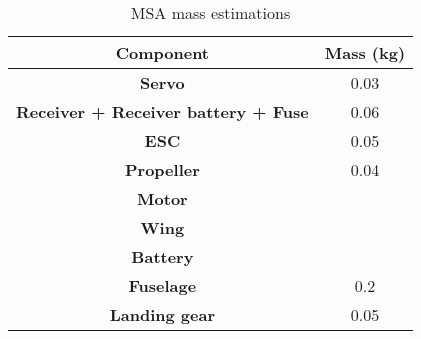 \begin{table}[H]
\centering
    \begin{tabular}{@{}cc@{}}
    \toprule
    \textbf{Component}                          & \textbf{Mass (kg)} \\ \midrule
    \textbf{Servo}                              & 0.03               \\
    \textbf{Receiver + Receiver battery + Fuse} & 0.06               \\
    \textbf{ESC}                                & 0.05               \\
    \textbf{Propeller}                          & 0.04               \\
    \textbf{Motor}                              &                    \\
    \textbf{Wing}                               &                    \\
    \textbf{Battery}                            &                    \\
    \textbf{Fuselage}                           & 0.2                \\
    \textbf{Landing gear}                       & 0.05               \\ \bottomrule
    \end{tabular}
\caption{MSA mass estimations}
\label{tab:msa_mass}
\end{table}